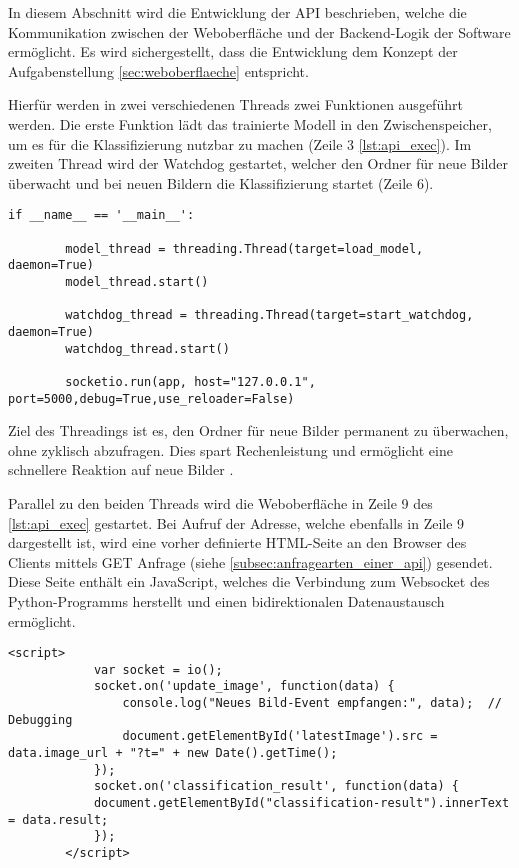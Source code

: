 In diesem Abschnitt wird die Entwicklung der API beschrieben, welche die Kommunikation zwischen der Weboberfläche und der Backend-Logik der Software ermöglicht. 
Es wird sichergestellt, dass die Entwicklung dem Konzept der Aufgabenstellung \autoref{sec:weboberflaeche} entspricht.

Hierfür werden in zwei verschiedenen Threads zwei Funktionen ausgeführt werden. Die erste Funktion lädt das trainierte Modell in den Zwischenspeicher, um es für die Klassifizierung nutzbar zu machen (Zeile 3 \autoref{lst:api_exec}). Im zweiten Thread wird der Watchdog gestartet, welcher den Ordner für neue Bilder überwacht und bei neuen Bildern die Klassifizierung startet (Zeile 6). 


\begin{lstlisting}[style=python, label=lst:api_exec, caption={Start der Weboberfläche und der Threads in der api.py}]
    if __name__ == '__main__':

        model_thread = threading.Thread(target=load_model, daemon=True)
        model_thread.start()

        watchdog_thread = threading.Thread(target=start_watchdog, daemon=True)
        watchdog_thread.start()

        socketio.run(app, host="127.0.0.1", port=5000,debug=True,use_reloader=False)

\end{lstlisting}

Ziel des Threadings ist es, den Ordner für neue Bilder permanent zu überwachen, ohne zyklisch abzufragen. Dies spart Rechenleistung und ermöglicht eine schnellere Reaktion auf neue Bilder \cite{noauthor_threading_nodate}.

Parallel zu den beiden Threads wird die Weboberfläche in Zeile 9 des \autoref{lst:api_exec} gestartet. Bei Aufruf der Adresse, welche ebenfalls in Zeile 9 dargestellt ist, wird eine vorher definierte \ac{HTML}-Seite an den Browser des Clients mittels GET Anfrage (siehe \autoref{subsec:anfragearten_einer_api}) gesendet. 
Diese Seite enthält ein JavaScript, welches die Verbindung zum Websocket des Python-Programms herstellt und einen bidirektionalen Datenaustausch ermöglicht.

\begin{lstlisting}[style=html, label=lst:weboberflaeche, caption={JavaScript Code der Weboberfläche, welcher die Bilder des Websockets empfängt}]
        <script>
            var socket = io();
            socket.on('update_image', function(data) {
                console.log("Neues Bild-Event empfangen:", data);  // Debugging
                document.getElementById('latestImage').src = data.image_url + "?t=" + new Date().getTime();
            });
            socket.on('classification_result', function(data) {
            document.getElementById("classification-result").innerText = data.result;
            });
        </script>

\end{lstlisting}

